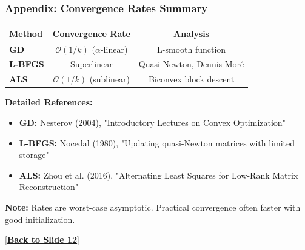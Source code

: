 \documentclass[aspectratio=169,usenames,dvipsnames]{beamer}
\begin{document}
\begin{frame}[label=app:convergence]
\frametitle{Appendix: Convergence Rates Summary}

\begin{center}
\renewcommand{\arraystretch}{1.8}
\begin{tabular}{|l|c|c|}
\hline
\textbf{Method} & \textbf{Convergence Rate} & \textbf{Analysis} \\
\hline
\textbf{GD} & $\mathcal{O}(1/k)$ ($\alpha$-linear) & L-smooth function \\
\hline
\textbf{L-BFGS} & Superlinear & Quasi-Newton, Dennis-Moré \\
\hline
\textbf{ALS} & $\mathcal{O}(1/k)$ (sublinear) & Biconvex block descent \\
\hline
\end{tabular}
\end{center}

\vspace{0.5cm}

\textbf{Detailed References:}

\begin{itemize}
  \item \textbf{GD:} Nesterov (2004), "Introductory Lectures on Convex Optimization"
  \item \textbf{L-BFGS:} Nocedal (1980), "Updating quasi-Newton matrices with limited storage"
  \item \textbf{ALS:} Zhou et al. (2016), "Alternating Least Squares for Low-Rank Matrix Reconstruction"
\end{itemize}

\vspace{0.3cm}

\textbf{Note:} Rates are worst-case asymptotic. Practical convergence often faster with good initialization.

\hyperlink{12}{[\textbf{Back to Slide 12}]}

\end{frame}
\end{document}
